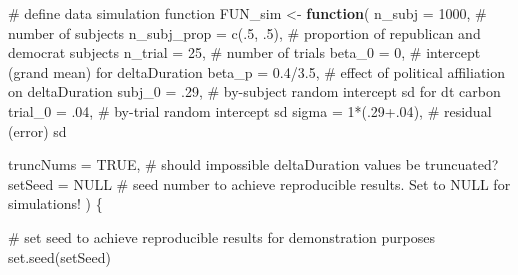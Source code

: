 \documentclass[
  letterpaper,
  DIV=11,
  numbers=noendperiod]{scrartcl}
\newenvironment{Shaded}{\begin{snugshade}}{\end{snugshade}}
\newcommand{\AttributeTok}[1]{\textcolor[rgb]{0.40,0.45,0.13}{#1}}
\newcommand{\CommentTok}[1]{\textcolor[rgb]{0.37,0.37,0.37}{#1}}
\newcommand{\ConstantTok}[1]{\textcolor[rgb]{0.56,0.35,0.01}{#1}}
\newcommand{\ControlFlowTok}[1]{\textcolor[rgb]{0.00,0.23,0.31}{\textbf{#1}}}
\newcommand{\DecValTok}[1]{\textcolor[rgb]{0.68,0.00,0.00}{#1}}
\newcommand{\FloatTok}[1]{\textcolor[rgb]{0.68,0.00,0.00}{#1}}
\newcommand{\FunctionTok}[1]{\textcolor[rgb]{0.28,0.35,0.67}{#1}}
\newcommand{\NormalTok}[1]{\textcolor[rgb]{0.00,0.23,0.31}{#1}}
\newcommand{\OtherTok}[1]{\textcolor[rgb]{0.00,0.23,0.31}{#1}}
\newcommand{\SpecialCharTok}[1]{\textcolor[rgb]{0.37,0.37,0.37}{#1}}
\begin{document}
\begin{Shaded}
\begin{Highlighting}[]
\CommentTok{\# define data simulation function}
\NormalTok{FUN\_sim }\OtherTok{\textless{}{-}} \ControlFlowTok{function}\NormalTok{(}
  \AttributeTok{n\_subj       =}        \DecValTok{1000}\NormalTok{, }\CommentTok{\# number of subjects}
  \AttributeTok{n\_subj\_prop  =}   \FunctionTok{c}\NormalTok{(.}\DecValTok{5}\NormalTok{, .}\DecValTok{5}\NormalTok{), }\CommentTok{\# proportion of republican and democrat subjects}
  \AttributeTok{n\_trial      =}          \DecValTok{25}\NormalTok{, }\CommentTok{\# number of trials}
  \AttributeTok{beta\_0       =}           \DecValTok{0}\NormalTok{, }\CommentTok{\# intercept (grand mean) for deltaDuration}
  \AttributeTok{beta\_p       =}     \FloatTok{0.4}\SpecialCharTok{/}\FloatTok{3.5}\NormalTok{, }\CommentTok{\# effect of political affiliation on deltaDuration}
  \AttributeTok{subj\_0       =}\NormalTok{         .}\DecValTok{29}\NormalTok{, }\CommentTok{\# by{-}subject random intercept sd for dt carbon}
  \AttributeTok{trial\_0      =}\NormalTok{         .}\DecValTok{04}\NormalTok{, }\CommentTok{\# by{-}trial random intercept sd}
  \AttributeTok{sigma        =} \DecValTok{1}\SpecialCharTok{*}\NormalTok{(.}\DecValTok{29}\FloatTok{+.04}\NormalTok{), }\CommentTok{\# residual (error) sd}
  
  \AttributeTok{truncNums    =}        \ConstantTok{TRUE}\NormalTok{, }\CommentTok{\# should impossible deltaDuration values be truncuated?}
  \AttributeTok{setSeed      =}        \ConstantTok{NULL}  \CommentTok{\# seed number to achieve reproducible results. Set to NULL for simulations!}
\NormalTok{) \{}
  
  \CommentTok{\# set seed to achieve reproducible results for demonstration purposes}
  \FunctionTok{set.seed}\NormalTok{(setSeed)}
  

\end{Highlighting}
\end{Shaded}
\end{document}
